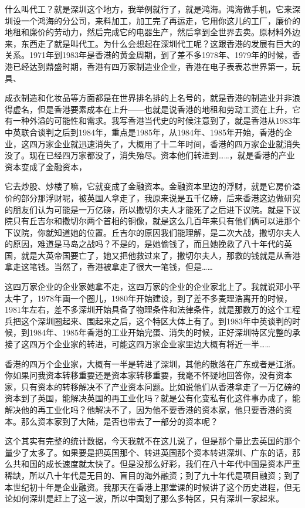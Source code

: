 \documentclass[UTF8, 12pt, a4paper]{ctexrep}
\begin{document}
什么叫代工？就是深圳这个地方，我举例就行了，就是鸿海。鸿海做手机，它来深圳设一个鸿海的分公司，来料加工，加工完了再运走，它用你这儿的工厂，廉价的地租和廉价的劳动力，然后完成它的电器生产，然后拿到全世界去卖。原材料外边来，东西走了就是叫代工。为什么会想起在深圳代工呢？这跟香港的发展有巨大的关系。1971年到1983年是香港的黄金周期，到了差不多1978年、1979年的时候，香港已经达到鼎盛时期，香港有四万家制造业企业，香港在电子表表芯世界第一，玩具、

成衣制造和化妆品等方面都是在世界排名排的上名号的，就是香港的制造业并非浪得虚名，但是香港要素成本在上升——也就是说香港的地租和劳动工资在上升，它有一种外溢的可能性和需求。我写香港当代史的时候注意到了，就是香港从1983年中英联合谈判之后到1984年，重点是1985年，从1984年、1985年开始，香港的企业，这四万家企业就迅速消失了，大概用了十二年时间，香港的四万家企业就消失没了。现在已经四万家都没了，消失殆尽。资本他们转进到……，就是香港的产业资本变成了金融资本，

它去炒股、炒楼了嘛，它就变成了金融资本。金融资本里边的浮财，就是它房价溢价的部分那浮财呢，被英国人拿走了，我原来说是五千亿磅，后来香港这边做研究的朋友们认为可能是一万亿磅，所以撒切尔夫人才能死了之后进下议院。就是下议院只有丘吉尔和撒切尔两个首相的铜像，就是这么几百年来只有他们俩可以进那个下议院，你就知道她的位置。丘吉尔的原因我们能理解，是二次大战，撒切尔夫人的原因，难道是马岛之战吗？不是的，是她偷钱了，而且她挽救了八十年代的英国，就是大英帝国要亡了，她又把他救过来了，撒切尔夫人，那救的钱就是从香港拿走这笔钱。当然了，香港被拿走了很大一笔钱，但是……

这四万家企业的企业家她拿不走，这四万家的企业的企业家北上了。我就说邓小平太牛了，1978年画一个圈儿，1980年开始建设，到了差不多麦理浩离开的时候，1981年左右，差不多深圳开始具备了物理条件和法律条件，就是那数万的这个工程兵把这个深圳圈起来、围起来之后，这个特区大体上有了。到1983年中英谈判的时候，到1984年、1985年香港的工业开始完蛋、消失的时候，正好深圳特区完整的承接了这四万个企业家的转进，可能这四万家企业家里边大概有将近一半……

香港的四万个企业家，大概有一半是转进了深圳，其他的散落在广东或者是江浙。你如果问我资本转移重要还是资本家转移重要，我毫不怀疑地回答你，没有资本家，只有资本的转移解决不了产业资本问题。比如说他们从香港拿走了一万亿磅的资本到了英国，能解决英国的再工业化吗？就是公有化变私有化这件事办成了，能解决他的再工业化吗？他解决不了，因为他不要香港的资本家，他只要香港的资本。那么资本家到了大陆，是否也带去了一部分的资本呢？

这个其实有完整的统计数据，今天我就不在这儿说了，但是那个量比去英国的那个量少了太多了。如果要是把英国那个、转进英国那个资本转进深圳、广东的话，那么共和国的成长速度就太快了。但是没那么好彩，我们在八十年代中国是资本严重稀缺，所以八十年代是无目的、盲目的海外融资；到了九十年代是项目融资；到了本世纪初十年是企业融资。我那天在香港上那堂课的时候讲了这个历史进程，但无论如何深圳是赶上了这一波，所以中国划了那么多特区，只有深圳一家起来。
\end{document}

